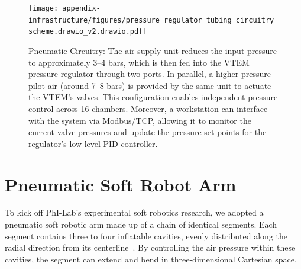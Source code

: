 \begin{figure}[ht]
     \centering
     \texttt{[image: appendix-infrastructure/figures/pressure\_regulator\_tubing\_circuitry\_scheme.drawio\_v2.drawio.pdf]}
     \caption{
     Pneumatic Circuitry: The air supply unit reduces the input pressure to approximately 3–4 bars, which is then fed into the VTEM pressure regulator through two ports. In parallel, a higher pressure pilot air (around 7–8 bars) is provided by the same unit to actuate the VTEM’s valves. This configuration enables independent pressure control across 16 chambers. Moreover, a workstation can interface with the system via Modbus/TCP, allowing it to monitor the current valve pressures and update the pressure set points for the regulator’s low-level PID controller.
     }
     \label{fig:apx:infrastructure:pressure_regulator_tubing_circuitry_scheme}
\end{figure}

\section{Pneumatic Soft Robot Arm}
To kick off PhI-Lab’s experimental soft robotics research, we adopted a pneumatic soft robotic arm made up of a chain of identical segments. Each segment contains three to four inflatable cavities, evenly distributed along the radial direction from its centerline~\citep{marchese2015recipe}. By controlling the air pressure within these cavities, the segment can extend and bend in three-dimensional Cartesian space.



